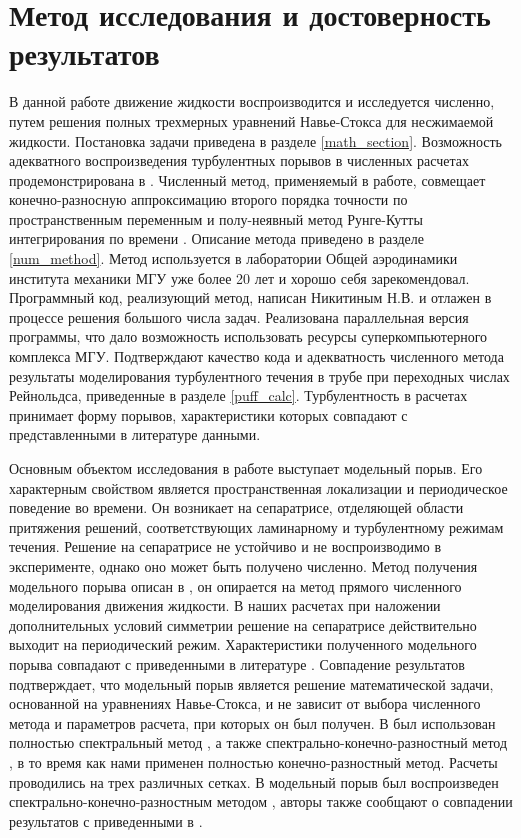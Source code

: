 \section{Метод исследования и достоверность результатов}

В данной работе движение жидкости воспроизводится и исследуется численно, путем решения полных трехмерных уравнений Навье-Стокса для несжимаемой жидкости. Постановка задачи приведена в разделе \ref{math_section}. Возможность адекватного воспроизведения турбулентных порывов в численных расчетах продемонстрирована в \cite{Priymak2004}. Численный метод, применяемый в работе, совмещает конечно-разносную аппроксимацию второго порядка точности по пространственным переменным и полу-неявный метод Рунге-Кутты интегрирования по времени \cite{Nikitin2006, Nikitin2006third}. Описание метода приведено в разделе \ref{num_method}. Метод используется в лаборатории Общей аэродинамики института механики МГУ уже более 20 лет и хорошо себя зарекомендовал. Программный код, реализующий метод, написан Никитиным Н.В. и отлажен в процессе решения большого числа задач. Реализована параллельная версия программы, что дало возможность использовать ресурсы суперкомпьютерного комплекса МГУ. Подтверждают качество кода и адекватность численного метода результаты моделирования турбулентного течения в трубе при переходных числах Рейнольдса, приведенные в разделе \ref{puff_calc}. Турбулентность в расчетах принимает форму порывов, характеристики которых совпадают с представленными в литературе данными. 

Основным объектом исследования в работе выступает модельный порыв. Его характерным свойством является пространственная локализации и периодическое поведение во времени. Он возникает на сепаратрисе, отделяющей области притяжения решений, соответствующих ламинарному и турбулентному режимам течения. Решение на сепаратрисе не устойчиво и не воспроизводимо в эксперименте, однако оно может быть получено численно. Метод получения модельного порыва описан в \cite{Avila2013}, он опирается на метод прямого численного моделирования движения жидкости. В наших расчетах при наложении дополнительных условий симметрии \cite{Avila2013} решение на сепаратрисе действительно выходит на периодический режим. Характеристики полученного модельного порыва совпадают с приведенными в литературе \cite{Avila2013, Chantry2014}. Совпадение результатов подтверждает, что модельный порыв является решение математической задачи, основанной на уравнениях Навье-Стокса, и не зависит от выбора численного метода и параметров расчета, при которых он был получен. В \cite{Avila2013} был использован полностью спектральный метод \cite{Meseguer2007}, а также спектрально-конечно-разностный метод \cite{Willis2009}, в то время как нами применен полностью конечно-разностный метод. Расчеты проводились на трех различных сетках. В \cite{Chantry2014} модельный порыв был воспроизведен спектрально-конечно-разностным методом \cite{Willis2009}, авторы также сообщают о совпадении результатов с приведенными в \cite{Avila2013}. 

